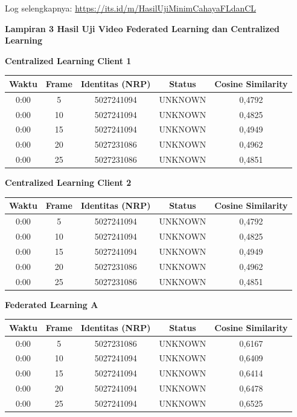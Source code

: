 \noindent Log selengkapnya: \url{https://its.id/m/HasilUjiMinimCahayaFLdanCL}

\clearpage
\noindent\textbf{Lampiran 3 Hasil Uji Video Federated Learning dan Centralized Learning}
\label{lampiran:3}

\vspace{2ex}

\noindent\textbf{Centralized Learning Client 1}
\begin{center}
  \small
  \begin{tabular}{|c|c|c|c|c|}
    \hline
    \textbf{Waktu} & \textbf{Frame} & \textbf{Identitas (NRP)} & \textbf{Status} & \textbf{Cosine Similarity} \\
    \hline
    0:00 & 5 & 5027241094 & UNKNOWN & 0,4792 \\
    0:00 & 10 & 5027241094 & UNKNOWN & 0,4825 \\
    0:00 & 15 & 5027241094 & UNKNOWN & 0,4949 \\
    0:00 & 20 & 5027231086 & UNKNOWN & 0,4962 \\
    0:00 & 25 & 5027231086 & UNKNOWN & 0,4851 \\
    \hline
  \end{tabular}
\end{center}

\noindent\textbf{Centralized Learning Client 2}
\begin{center}
  \small
  \begin{tabular}{|c|c|c|c|c|}
    \hline
    \textbf{Waktu} & \textbf{Frame} & \textbf{Identitas (NRP)} & \textbf{Status} & \textbf{Cosine Similarity} \\
    \hline
    0:00 & 5 & 5027241094 & UNKNOWN & 0,4792 \\
    0:00 & 10 & 5027241094 & UNKNOWN & 0,4825 \\
    0:00 & 15 & 5027241094 & UNKNOWN & 0,4949 \\
    0:00 & 20 & 5027231086 & UNKNOWN & 0,4962 \\
    0:00 & 25 & 5027231086 & UNKNOWN & 0,4851 \\
    \hline
  \end{tabular}
\end{center}

\noindent\textbf{Federated Learning A}
\begin{center}
  \small
  \begin{tabular}{|c|c|c|c|c|}
    \hline
    \textbf{Waktu} & \textbf{Frame} & \textbf{Identitas (NRP)} & \textbf{Status} & \textbf{Cosine Similarity} \\
    \hline
    0:00 & 5 & 5027231086 & UNKNOWN & 0,6167 \\
    0:00 & 10 & 5027241094 & UNKNOWN & 0,6409 \\
    0:00 & 15 & 5027241094 & UNKNOWN & 0,6414 \\
    0:00 & 20 & 5027241094 & UNKNOWN & 0,6478 \\
    0:00 & 25 & 5027241094 & UNKNOWN & 0,6525 \\
    \hline
  \end{tabular}
\end{center}

